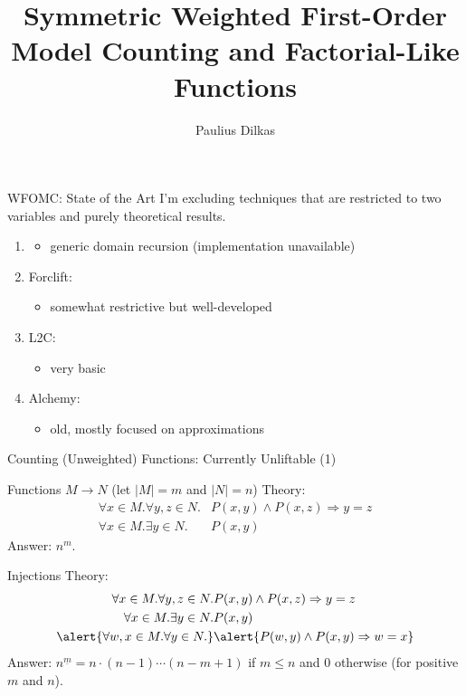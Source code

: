 \documentclass{beamer}
\author{Paulius Dilkas}
\title{Symmetric Weighted First-Order Model Counting and Factorial-Like Functions}
\date{}
\begin{document}

\maketitle

\begin{frame}{WFOMC: State of the Art}
  I'm excluding techniques that are restricted to two variables and purely
  theoretical results.
  \begin{enumerate}
  \item \cite{DBLP:conf/nips/KazemiKBP16}
    \begin{itemize}
    \item generic domain recursion (implementation unavailable)
    \end{itemize}
  \item \alert{Forclift}: \cite{DBLP:conf/ijcai/BroeckTMDR11}
    \begin{itemize}
    \item somewhat restrictive but well-developed
    \end{itemize}
  \item \alert{L2C}: \cite{DBLP:conf/kr/KazemiP16}
    \begin{itemize}
    \item very basic
    \end{itemize}
  \item \alert{Alchemy}: \cite{DBLP:conf/aaai/DomingosKPRS06}
    \begin{itemize}
    \item old, mostly focused on approximations
    \end{itemize}
  \end{enumerate}
\end{frame}

\begin{frame}{Counting (Unweighted) Functions: Currently Unliftable (1)}
  \cite{stanley2011enumerative}
  \begin{block}{Functions $M \to N$ (let $|M| = m$ and $|N| = n$)}
    Theory:
    \begin{align*}
      \forall x \in M. \forall y, z \in N. &P(x, y) \land P(x, z) \Rightarrow y=z \\
      \forall x \in M. \exists y \in N. &P(x, y)
    \end{align*}
    Answer: $n^m$.
  \end{block}
  \begin{block}{Injections}
    Theory:
    \begin{align*}
      \forall x \in M. \forall y, z \in N. &P(x, y) \land P(x, z) \Rightarrow y=z \\
      \forall x \in M. \exists y \in N. &P(x, y) \\
      \alert{\forall w, x \in M. \forall y \in N.} &\alert{P(w, y) \land P(x, y) \Rightarrow w=x}
    \end{align*}
    Answer: $n^{\underline{m}} = n \cdot (n-1)\cdots(n-m+1)$ if $m \le n$ and $0$ otherwise (for positive $m$ and $n$).
  \end{block}
\end{frame}
\end{document}
